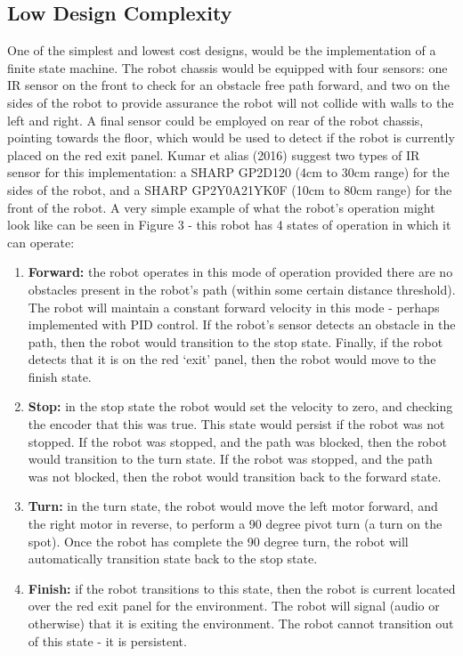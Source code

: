 \documentclass[a4paper]{article}
\begin{document}
\subsection{Low Design Complexity}
One of the simplest and lowest cost designs, would be the implementation of a finite state machine. The robot chassis would be equipped with four sensors: one IR sensor on the front to check for an obstacle free path forward, and two on the sides of the robot to provide assurance the robot will not collide with walls to the left and right. A final sensor could be employed on rear of the robot chassis, pointing towards the floor, which would be used to detect if the robot is currently placed on the red exit panel. Kumar et alias (2016) suggest two types of IR sensor for this implementation: a SHARP GP2D120 (4cm to 30cm range) for the sides of the robot, and a SHARP GP2Y0A21YK0F (10cm to 80cm range) for the front of the robot. A very simple example of what the robot’s operation might look like can be seen in Figure 3 - this robot has 4 states of operation in which it can operate:
\begin{enumerate}
\item \textbf{Forward:} the robot operates in this mode of operation provided there are no obstacles present in the robot’s path (within some certain distance threshold). The robot will maintain a constant forward velocity in this mode - perhaps implemented with PID control. If the robot’s sensor detects an obstacle in the path, then the robot would transition to the stop state. Finally, if the robot detects that it is on the red ‘exit’ panel, then the robot would move to the finish state.
\item \textbf{Stop:} in the stop state the robot would set the velocity to zero, and checking the encoder that this was true. This state would persist if the robot was not stopped. If the robot was stopped, and the path was blocked, then the robot would transition to the turn state. If the robot was stopped, and the path was not blocked, then the robot would transition back to the forward state.
\item \textbf{Turn:} in the turn state, the robot would move the left motor forward, and the right motor in reverse, to perform a 90 degree pivot turn (a turn on the spot). Once the robot has complete the 90 degree turn, the robot will automatically transition state back to the stop state.
\item \textbf{Finish:} if the robot transitions to this state, then the robot is current located over the red exit panel for the environment. The robot will signal (audio or otherwise) that it is exiting the environment. The robot cannot transition out of this state - it is persistent.
\end{enumerate}
\end{document}
